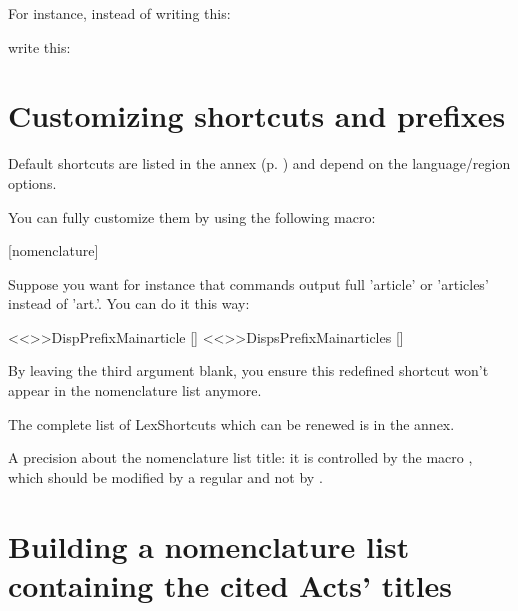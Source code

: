 \documentclass[a4paper]{ltxdockit}[2011/03/25]
\newcommand{\variable}[1]{$\langle$\textsl{#1}$\rangle$}
\begin{document}
For instance, instead of writing this:


write this:



\section{Customizing shortcuts and prefixes}\label{customization}

Default shortcuts are listed in the annex (p. \pageref{annex}) and depend on the language/region options.

You can fully customize them by using the following macro:

\begin{ltxsyntax}
[nomenclature]
\end{ltxsyntax} 

Suppose you want for instance that \cs{\variable{Act's macro}} commands output full 'article' or 'articles' instead of 'art.'. You can do it this way:

\begin{ltxcode}
<<\RenewLexShortcut>>{DispPrefixMain}{article }[]
<<\RenewLexShortcut>>{DispsPrefixMain}{articles }[]
\end{ltxcode} 

By leaving the third argument blank, you ensure this redefined shortcut won't appear in the nomenclature list anymore.

The complete list of LexShortcuts which can be renewed is in the annex.

A precision about the nomenclature list title: it is controlled by the macro , which should be modified by a regular  and not by .

\section{Building a nomenclature list containing the cited Acts' titles}\label{nomenclature}
\end{document}
